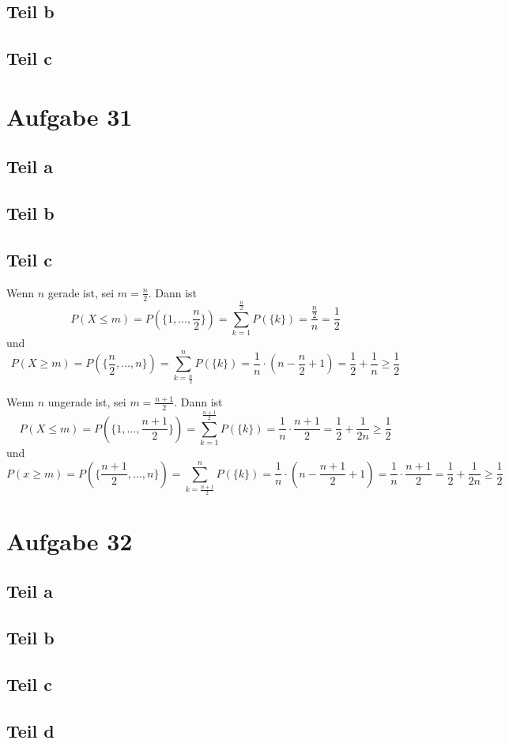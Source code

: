 \documentclass[10pt,a4paper]{article}
\begin{document}
\subsection{Teil b}

\subsection{Teil c}

\section{Aufgabe 31}

\subsection{Teil a}

\subsection{Teil b}

\subsection{Teil c}
Wenn $n$ gerade ist, sei $m = \frac{n}{2}$.
Dann ist
\begin{equation}
  P(X \le m) = P(\{ 1, \dots, \frac{n}{2} \}) = \sum_{k = 1}^{\frac{n}{2}} P(\{k\}) = \frac{\frac{n}{2}}{n} = \frac{1}{2}
\end{equation}
und
\begin{equation}
  P(X \ge m) = P(\{ \frac{n}{2}, \dots, n \}) = \sum_{k = \frac{n}{2}}^{n} P(\{k\}) = \frac{1}{n} \cdot (n - \frac{n}{2} + 1) = \frac{1}{2} + \frac{1}{n} \ge \frac{1}{2}
\end{equation}

Wenn $n$ ungerade ist, sei $m = \frac{n + 1}{2}$.
Dann ist
\begin{equation}
  P(X \le m) = P(\{ 1, \dots, \frac{n + 1}{2} \}) = \sum_{k = 1}^{\frac{n + 1}{2}} P(\{k\}) = \frac{1}{n} \cdot \frac{n + 1}{2} = \frac{1}{2} + \frac{1}{2n} \ge \frac{1}{2}
\end{equation}
und
\begin{equation}
  P(x \ge m) = P(\{ \frac{n + 1}{2}, \dots, n \}) = \sum_{k = \frac{n + 1}{2}}^{n} P(\{k\}) = \frac{1}{n} \cdot \left( n - \frac{n + 1}{2} + 1 \right) = \frac{1}{n} \cdot \frac{n + 1}{2} = \frac{1}{2} + \frac{1}{2n} \ge \frac{1}{2}
\end{equation}

\section{Aufgabe 32}

\subsection{Teil a}

\subsection{Teil b}

\subsection{Teil c}

\subsection{Teil d}
\end{document}
